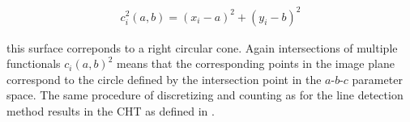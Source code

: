 \begin{align}
c_i^2(a, b) = (x_i-a)^2 + (y_i-b)^2
\end{align}

this surface correponds to a right circular cone. Again intersections of multiple functionals $c_i(a, b)^2$ means that the corresponding points in the image plane correspond to the circle defined by the intersection point in the $a$-$b$-$c$ parameter space. The same procedure of discretizing and counting as for the line detection method results in the CHT as defined in \cite{10.1145/361237.361242}.
